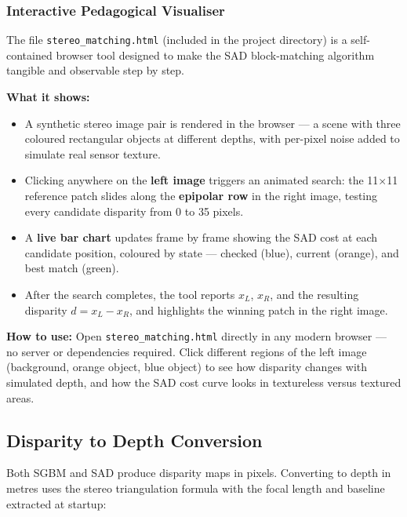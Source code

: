 \documentclass[12pt, a4paper]{article}
\newcommand{\code}[1]{\texttt{\small#1}}
\begin{document}
\subsubsection{Interactive Pedagogical Visualiser}

The file \code{stereo\_matching.html} (included in the project directory) is a
self-contained browser tool designed to make the SAD block-matching algorithm
tangible and observable step by step.

\textbf{What it shows:}
\begin{itemize}
  \item A synthetic stereo image pair is rendered in the browser --- a scene
        with three coloured rectangular objects at different depths, with per-pixel
        noise added to simulate real sensor texture.
  \item Clicking anywhere on the \textbf{left image} triggers an animated search:
        the 11$\times$11 reference patch slides along the \textbf{epipolar row}
        in the right image, testing every candidate disparity from 0 to 35
        pixels.
  \item A \textbf{live bar chart} updates frame by frame showing the SAD cost at
        each candidate position, coloured by state --- checked (blue), current
        (orange), and best match (green).
  \item After the search completes, the tool reports $x_L$, $x_R$, and the
        resulting disparity $d = x_L - x_R$, and highlights the winning patch in
        the right image.
\end{itemize}

\begin{notebox}
\textbf{How to use:} Open \code{stereo\_matching.html} directly in any modern
browser --- no server or dependencies required. Click different regions of the
left image (background, orange object, blue object) to see how disparity changes
with simulated depth, and how the SAD cost curve looks in textureless versus
textured areas.
\end{notebox}

\subsection{Disparity to Depth Conversion}

Both SGBM and SAD produce disparity maps in pixels. Converting to depth in
metres uses the stereo triangulation formula with the focal length and baseline
extracted at startup:
\end{document}
